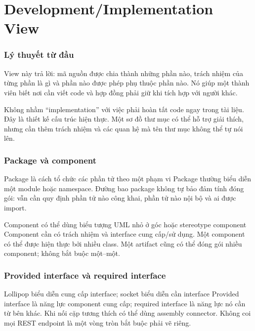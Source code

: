 \chapter{Development/Implementation View}
\subsection{Lý thuyết từ đầu}
View này trả lời: mã nguồn được chia thành những phần nào, trách nhiệm của từng phần là gì và phần nào được phép phụ thuộc phần nào. Nó giúp một thành viên biết nơi cần viết code và hợp đồng phải giữ khi tích hợp với người khác.

Không nhầm ``implementation'' với việc phải hoàn tất code ngay trong tài liệu. Đây là thiết kế cấu trúc hiện thực. Một sơ đồ thư mục có thể hỗ trợ giải thích, nhưng cần thêm trách nhiệm và các quan hệ mà tên thư mục không thể tự nói lên.

\subsection{Package và component}
  {Package là cách tổ chức các phần tử theo một phạm vi}
Package thường biểu diễn một module hoặc namespace. Đường bao package không tự bảo đảm tính đóng gói: vẫn cần quy định phần tử nào công khai, phần tử nào nội bộ và ai được import.

  {Component có thể dùng biểu tượng UML nhỏ ở góc hoặc stereotype component}
Component cần có trách nhiệm và interface cung cấp/sử dụng. Một component có thể được hiện thực bởi nhiều class. Một artifact cũng có thể đóng gói nhiều component; không bắt buộc một--một.

\subsection{Provided interface và required interface}
  {Lollipop biểu diễn cung cấp interface; socket biểu diễn cần interface}
Provided interface là năng lực component cung cấp; required interface là năng lực nó cần từ bên khác. Khi nối cặp tương thích có thể dùng assembly connector. Không coi mọi REST endpoint là một vòng tròn bắt buộc phải vẽ riêng.

